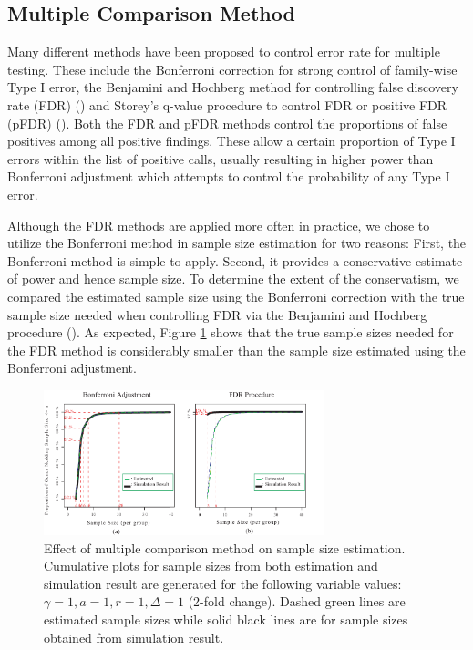 \documentclass{bioinfo}
\begin{document}
\subsection{Multiple Comparison Method}

Many different methods have been proposed to control error rate for
multiple testing.  These include the Bonferroni correction for
strong control of family-wise Type I error, the Benjamini and
Hochberg method for controlling false discovery rate (FDR)
(\citealp{Benjamini95}) and Storey's q-value procedure to control
FDR or positive FDR (pFDR) (\citealp{Storey02}).  Both the FDR and
pFDR methods control the proportions of false positives among all
positive findings.  These allow a certain proportion of Type I
errors within the list of positive calls, usually resulting in
higher power than Bonferroni adjustment which attempts to control
the probability of any Type I error.

Although the FDR methods are applied more often in practice, we
chose to utilize the Bonferroni method in sample size estimation for
two reasons: First, the Bonferroni method is simple to apply.
Second, it provides a conservative estimate of power and hence
sample size.  To determine the extent of the conservatism, we
compared the estimated sample size using the Bonferroni correction
with the true sample size needed when controlling FDR via the
Benjamini and Hochberg procedure (\citealp{Benjamini95}). As
expected, Figure \ref{fig:ResMtd} shows that the true sample sizes
needed for the FDR method is considerably smaller than the sample
size estimated using the Bonferroni adjustment.

\begin{figure}[h]
  \centerline{\includegraphics*[width=3.2in]{ResMtd.pdf}}
  \caption[Effect of multiple comparison method on sample size
    estimation] {Effect of multiple comparison method on sample size
    estimation.  Cumulative plots for sample sizes from both
    estimation and simulation result are generated for the following
    variable values: $\gamma = 1, a = 1, r = 1, \Delta = 1$ (2-fold
    change). Dashed green lines are estimated sample sizes while solid
    black lines are for sample sizes obtained from simulation result.}
  \label{fig:ResMtd}
\end{figure}
\end{document}
